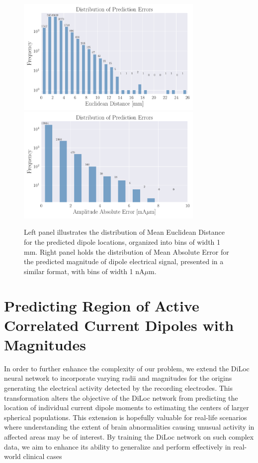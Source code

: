 \documentclass[a4paper, UKenglish, 11pt]{uiomaster}
\begin{document}
\begin{figure}
  \hspace*{-2cm} %
  \includegraphics[width=9cm]{figures/new_histogram_position_amplitude.pdf}
  \includegraphics[width=9cm]{figures/new_histogram_amplitude_amplitude.pdf}
  \caption{Left panel illustrates the distribution of Mean Euclidean Distance for the predicted dipole locations, organized into bins of width 1 mm. Right panel holds the distribution of Mean Absolute Error for the predicted magnitude of dipole electrical signal, presented in a similar format, with bins of width 1 nA$\mu$m.}
  \label{fig:histogram_magnitude}
\end{figure}










\section{Predicting Region of Active Correlated Current Dipoles with Magnitudes}

In order to further enhance the complexity of our problem, we extend the DiLoc neural network to incorporate varying radii and magnitudes for the origins generating the electrical activity detected by the recording electrodes. This transformation alters the objective of the DiLoc network from predicting the location of individual current dipole moments to estimating the centers of larger spherical populations. This extension is hopefully valuable for real-life scenarios where understanding the extent of brain abnormalities causing unusual activity in affected areas may be of interest. By training the DiLoc network on such complex data, we aim to enhance its ability to generalize and perform effectively in real-world clinical cases
\end{document}
